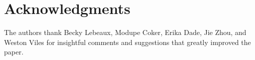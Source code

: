 \documentclass[10pt,letterpaper]{article}
\begin{document}
\section*{Acknowledgments}
The authors thank Becky Lebeaux, Modupe Coker, Erika Dade, Jie Zhou, and Weston Viles for insightful comments and suggestions that greatly improved the paper. 

\nolinenumbers
%
%
% 

\end{document}
